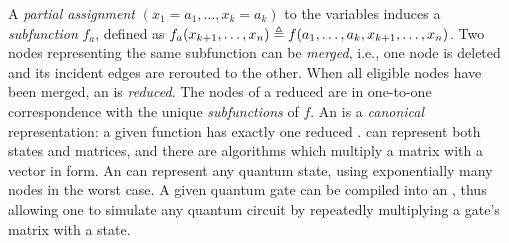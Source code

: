 
A \emph{partial assignment} $(x_1=a_1,\ldots, x_k=a_k)$ to the variables induces a \emph{subfunction} $f_a$, defined as $f_a(x_{k+1},\ldots, x_n)\triangleq f(a_1,\ldots, a_k,x_{k+1},\ldots, x_n)$.
Two \add nodes representing the same subfunction can be \emph{merged}, i.e., one node is deleted and its incident edges are rerouted to the other.
When all eligible nodes have been merged, an \add is \emph{reduced}.
The nodes of a reduced \add are in one-to-one correspondence with the unique \emph{subfunctions} of $f$.
An \add is a \emph{canonical} representation: a given function has exactly one reduced \add.
\adds can represent both states and matrices, and there are algorithms which multiply a matrix with a vector in \add form.
An \add can represent any quantum state, using exponentially many nodes in the worst case.
A given quantum gate can be compiled into an \add, thus allowing one to simulate any quantum circuit by repeatedly multiplying a gate's matrix with a state. %

